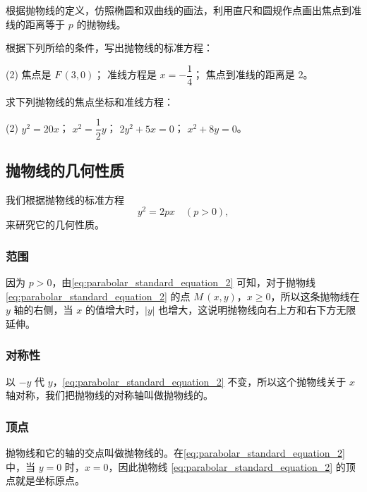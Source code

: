 \begin{Practice}
  \begin{question}
    \item 根据抛物线的定义，仿照椭圆和双曲线的画法，利用直尺和圆规作点画出焦点到准线的距离等于 $p$ 的抛物线。
    \item 根据下列所给的条件，写出抛物线的标准方程：
    \begin{tasks}(2)
      \task 焦点是 $F\,(3,0)$；
      \task 准线方程是 $x=-\dfrac{1}{4}$；
      \task 焦点到准线的距离是 2。
    \end{tasks}
    \item 求下列抛物线的焦点坐标和准线方程：
    \begin{tasks}(2)
      \task $y^2=20x$；
      \task $x^2=\dfrac{1}{2}y$；
      \task $2y^2+5x= 0$；
      \task $x^2+8y= 0$。
    \end{tasks}
  \end{question}
\end{Practice}
\subsection{抛物线的几何性质}
我们根据抛物线的标准方程
\begin{equation}
  \label{eq:parabolar_standard_equation_2}
  y^2=2px\quad(p>0),
\end{equation}
来研究它的几何性质。

\subsubsection{范围}
因为 $p>0$，由\cref{eq:parabolar_standard_equation_2} 可知，对于抛物线 \eqref{eq:parabolar_standard_equation_2} 的点 $M\,(x,y)$，$x\geqslant 0$，所以这条抛物线在 $y$ 轴的右侧，当 $x$ 的值增大时，$|y|$ 也增大，这说明抛物线向右上方和右下方无限延伸。

\subsubsection{对称性}
以 $-y$ 代 $y$，\cref{eq:parabolar_standard_equation_2} 不变，所以这个抛物线关于 $x$ 轴对称，我们把抛物线的对称轴叫做抛物线的。

\subsubsection{顶点}
抛物线和它的轴的交点叫做抛物线的。在\cref{eq:parabolar_standard_equation_2} 中，当 $y=0$ 时，$x=0$，因此抛物线 \eqref{eq:parabolar_standard_equation_2} 的顶点就是坐标原点。

